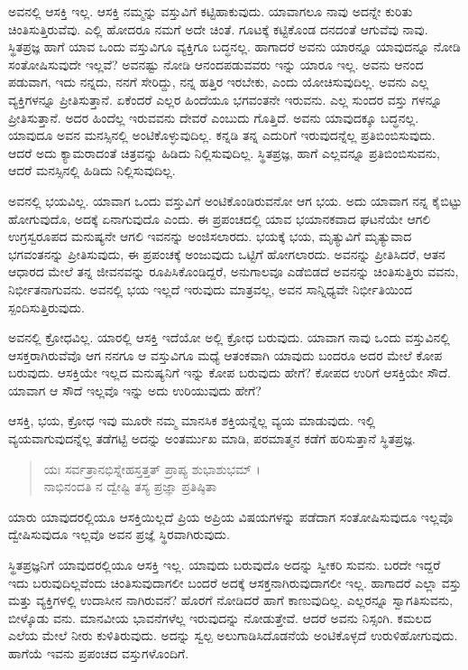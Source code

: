 ಅವನಲ್ಲಿ ಆಸಕ್ತಿ ಇಲ್ಲ. ಆಸಕ್ತಿ ನಮ್ಮನ್ನು ವಸ್ತುವಿಗೆ ಕಟ್ಟಿಹಾಕುವುದು. ಯಾವಾಗಲೂ ನಾವು ಅದನ್ನೇ ಕುರಿತು ಚಿಂತಿಸುತ್ತಿರುವೆವು. ಎಲ್ಲಿ ಹೋದರೂ ನಮಗೆ ಅದೇ ಚಿಂತೆ. ಗೂಟಕ್ಕೆ ಕಟ್ಟಿಕೊಂಡ ದನದಂತೆ ಆಗುವೆವು ನಾವು. ಸ್ಥಿತಪ್ರಜ್ಞ ಹಾಗೆ ಯಾವ ಒಂದು ವಸ್ತುವಿಗೂ ವ್ಯಕ್ತಿಗೂ ಬದ್ಧನಲ್ಲ. ಹಾಗಾದರೆ ಅವನು ಯಾರನ್ನೂ ಯಾವುದನ್ನೂ ನೋಡಿ ಸಂತೋಷಿಸುವುದೇ ಇಲ್ಲವೆ? ಅವನಷ್ಟು ನೋಡಿ ಆನಂದಪಡುವವರು ಇನ್ನು ಯಾರೂ ಇಲ್ಲ. ಅವನು ಆನಂದ ಪಡುವಾಗ, ಇದು ನನ್ನದು, ನನಗೆ ಸೇರಿದ್ದು, ನನ್ನ ಹತ್ತಿರ ಇರಬೇಕು, ಎಂದು ಯೋಚಿಸುವುದಿಲ್ಲ. ಅವನು ಎಲ್ಲ ವ್ಯಕ್ತಿಗಳನ್ನೂ ಪ್ರೀತಿಸುತ್ತಾನೆ. ಏಕೆಂದರೆ ಎಲ್ಲರ ಹಿಂದೆಯೂ ಭಗವಂತನೇ ಇರುವನು. ಎಲ್ಲ ಸುಂದರ ವಸ್ತು ಗಳನ್ನೂ ಪ್ರೀತಿಸುತ್ತಾನೆ. ಅದರ ಹಿಂದೆಲ್ಲ ಇರುವವನು ದೇವರೆ ಎಂಬುದು ಗೊತ್ತಿದೆ. ಅವನು ಯಾವುದಕ್ಕೂ ಬದ್ಧನಲ್ಲ. ಯಾವುದೂ ಅವನ ಮನಸ್ಸಿನಲ್ಲಿ ಅಂಟಿಕೊಳ್ಳುವುದಿಲ್ಲ. ಕನ್ನಡಿ ತನ್ನ ಎದುರಿಗೆ ಇರುವುದನ್ನೆಲ್ಲ ಪ್ರತಿಬಿಂಬಿಸುವುದು. ಆದರೆ ಅದು ಕ್ಯಾಮರಾದಂತೆ ಚಿತ್ರವನ್ನು ಹಿಡಿದು ನಿಲ್ಲಿಸುವುದಿಲ್ಲ. ಸ್ಥಿತಪ್ರಜ್ಞ, ಹಾಗೆ ಎಲ್ಲವನ್ನೂ ಪ್ರತಿಬಿಂಬಿಸುವನು, ಆದರೆ ಮನಸ್ಸಿನಲ್ಲಿ ಹಿಡಿದು ನಿಲ್ಲಿಸುವುದಿಲ್ಲ.

ಅವನಲ್ಲಿ ಭಯವಿಲ್ಲ. ಯಾವಾಗ ಒಂದು ವಸ್ತುವಿಗೆ ಅಂಟಿಕೊಂಡಿರುವನೋ ಆಗ ಭಯ. ಅದು ಯಾವಾಗ ನನ್ನ ಕೈಬಿಟ್ಟು ಹೋಗುವುದೊ, ಅದಕ್ಕೆ ಏನಾಗುವುದೊ ಎಂದು. ಈ ಪ್ರಪಂಚದಲ್ಲಿ ಯಾವ ಭಯಾನಕವಾದ ಘಟನೆಯೇ ಆಗಲಿ ಉಗ್ರಸ್ವರೂಪದ ಮನುಷ್ಯನೇ ಆಗಲಿ ಇವನನ್ನು ಅಂಜಿಸಲಾರದು. ಭಯಕ್ಕೆ ಭಯ, ಮೃತ್ಯುವಿಗೆ ಮೃತ್ಯುವಾದ ಭಗವಂತನನ್ನು ಪ್ರೀತಿಸುವುದು, ಈ ಪ್ರಪಂಚಕ್ಕೆ ಅಂಜುವುದು ಒಟ್ಟಿಗೆ ಹೋಗಲಾರದು. ಅವನನ್ನು ಪ್ರೀತಿಸಿದರೆ, ಆತನ ಆಧಾರದ ಮೇಲೆ ತನ್ನ ಜೀವನವನ್ನು ರೂಪಿಸಿಕೊಂಡಿದ್ದರೆ, ಅನುಗಾಲವೂ ಎಡೆಬಿಡದೆ ಅವನನ್ನು ಚಿಂತಿಸುತ್ತಿರು ವವನು, ನಿರ್ಭೀತನಾಗುವನು. ಅವನಲ್ಲಿ ಭಯ ಇಲ್ಲದೆ ಇರುವುದು ಮಾತ್ರವಲ್ಲ, ಅವನ ಸಾನ್ನಿಧ್ಯವೇ ನಿರ್ಭೀತಿಯಿಂದ ಸ್ಪಂದಿಸುತ್ತಿರುವುದು.

ಅವನಲ್ಲಿ ಕ್ರೋಧವಿಲ್ಲ. ಯಾರಲ್ಲಿ ಆಸಕ್ತಿ ಇದೆಯೋ ಅಲ್ಲಿ ಕ್ರೋಧ ಬರುವುದು. ಯಾವಾಗ ನಾವು ಒಂದು ವಸ್ತುವಿನಲ್ಲಿ ಆಸಕ್ತರಾಗಿರುವೆವೊ ಆಗ ನನಗೂ ಆ ವಸ್ತುವಿಗೂ ಮಧ್ಯೆ ಆತಂಕವಾಗಿ ಯಾವುದು ಬಂದರೂ ಅದರ ಮೇಲೆ ಕೋಪ ಬರುವುದು. ಆಸಕ್ತಿಯೇ ಇಲ್ಲದ ಮನುಷ್ಯನಿಗೆ ಇನ್ನು ಕೋಪ ಬರುವುದು ಹೇಗೆ? ಕೋಪದ ಉರಿಗೆ ಆಸಕ್ತಿಯೇ ಸೌದೆ. ಯಾವಾಗ ಆ ಸೌದೆ ಇಲ್ಲವೊ ಇನ್ನು ಅದು ಉರಿಯುವುದು ಹೇಗೆ?

ಆಸಕ್ತಿ, ಭಯ, ಕ್ರೋಧ ಇವು ಮೂರೇ ನಮ್ಮ ಮಾನಸಿಕ ಶಕ್ತಿಯನ್ನೆಲ್ಲ ವ್ಯಯ ಮಾಡುವುದು. ಇಲ್ಲಿ ವ್ಯಯವಾಗುವುದನ್ನೆಲ್ಲ ತಡೆಗಟ್ಟಿ ಅದನ್ನು ಅಂತರ್ಮುಖ ಮಾಡಿ, ಪರಮಾತ್ಮನ ಕಡೆಗೆ ಹರಿಸುತ್ತಾನೆ ಸ್ಥಿತಪ್ರಜ್ಞ.

\begin{verse}
ಯಃ ಸರ್ವತ್ರಾನಭಿಸ್ನೇಹಸ್ತತ್ತತ್ ಪ್ರಾಪ್ಯ ಶುಭಾಶುಭಮ್ ।\\ನಾಭಿನಂದತಿ ನ ದ್ವೇಷ್ಟಿ ತಸ್ಯ ಪ್ರಜ್ಞಾ ಪ್ರತಿಷ್ಠಿತಾ 
\end{verse}

{\small ಯಾರು ಯಾವುದರಲ್ಲಿಯೂ ಆಸಕ್ತಿಯಿಲ್ಲದೆ ಪ್ರಿಯ ಅಪ್ರಿಯ ವಿಷಯಗಳನ್ನು ಪಡೆದಾಗ ಸಂತೋಷಿಸುವುದೂ ಇಲ್ಲವೊ ದ್ವೇಷಿಸುವುದೂ ಇಲ್ಲವೊ ಅವನ ಪ್ರಜ್ಞೆ ಸ್ಥಿರವಾಗಿರುವುದು.}

ಸ್ಥಿತಪ್ರಜ್ಞನಿಗೆ ಯಾವುದರಲ್ಲಿಯೂ ಆಸಕ್ತಿ ಇಲ್ಲ. ಯಾವುದು ಬರುವುದೊ ಅದನ್ನು ಸ್ವೀಕರಿ ಸುವನು. ಬರದೇ ಇದ್ದರೆ ಇದು ಬರುವುದಿಲ್ಲವೆಂದು ಚಿಂತಿಸುವುದಾಗಲೀ ಬಂದರೆ ಅದಕ್ಕೆ ಆಸಕ್ತನಾಗಿರುವುದಾಗಲೀ ಇಲ್ಲ. ಹಾಗಾದರೆ ಎಲ್ಲಾ ವಸ್ತು ಮತ್ತು ವ್ಯಕ್ತಿಗಳಲ್ಲಿ ಉದಾಸೀನ ನಾಗಿರುವನೆ? ಹೊರಗೆ ನೋಡಿದರೆ ಹಾಗೆ ಕಾಣುವುದಿಲ್ಲ. ಎಲ್ಲರನ್ನೂ ಸ್ವಾಗತಿಸುವನು, ಬೀಳ್ಕೊಡು ವನು. ಮಾನವೀಯ ಭಾವನೆಗಳೆಲ್ಲ ಇರುವುದನ್ನು ನೋಡುತ್ತೇವೆ. ಆದರೆ ಅವನು ನಿಸ್ಸಂಗಿ. ಕಮಲದ ಎಲೆಯ ಮೇಲೆ ನೀರು ಕುಳಿತಿರುವುದು. ಅದನ್ನು ಸ್ವಲ್ಪ ಅಲುಗಾಡಿಸಿದೊಡನೆಯೆ ಅಂಟಿಕೊಳ್ಳದೆ ಉರುಳಿಹೋಗುವುದು. ಹಾಗೆಯೆ ಇವನು ಪ್ರಪಂಚದ ವಸ್ತುಗಳೊಂದಿಗೆ.

